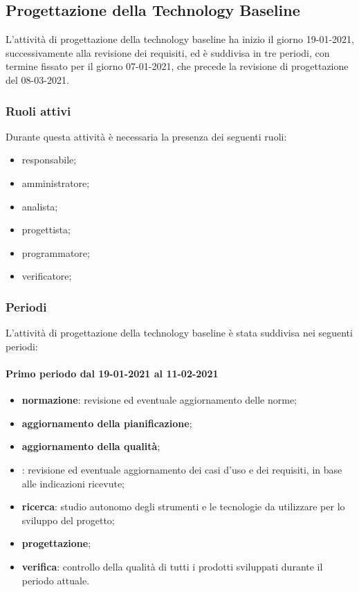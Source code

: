 	\newpage
	
	\subsection{Progettazione della Technology Baseline}
	L'attività di progettazione della technology baseline ha inizio il giorno 19-01-2021, successivamente
	alla revisione dei requisiti, ed è suddivisa in tre periodi, con termine fissato per il giorno 07-01-2021,
	che precede la revisione di progettazione del 08-03-2021.
	
	\subsubsection{Ruoli attivi}
	Durante questa attività è necessaria la presenza dei seguenti ruoli:
	\begin{itemize}
	\item responsabile;
	\item amministratore;
	\item analista;
	\item progettista;
	\item programmatore;
	\item verificatore;
	\end{itemize}

	\subsubsection{Periodi}
	L'attività di progettazione della technology baseline è stata suddivisa nei seguenti periodi:
	
	\paragraph{Primo periodo dal 19-01-2021 al 11-02-2021}
	\begin{itemize}
	\item \textbf{normazione}: revisione ed eventuale aggiornamento delle norme;
	\item \textbf{aggiornamento della pianificazione};
	\item \textbf{aggiornamento della qualità};
	\item \textbf{}: revisione ed eventuale aggiornamento dei casi d’uso e dei requisiti, in base alle indicazioni ricevute;
	\item \textbf{ricerca}: studio autonomo degli strumenti e le tecnologie da utilizzare per lo sviluppo del
	progetto;
	\item \textbf{progettazione};
	\item \textbf{verifica}: controllo della qualità di tutti i prodotti sviluppati durante il periodo attuale.
	\end{itemize}

